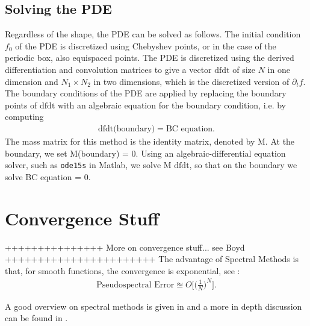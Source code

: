 \subsection{Solving the PDE}
Regardless of the shape, the PDE can be solved as follows.
The initial condition $f_0$ of the PDE is discretized using Chebyshev points, or in the case of the periodic box, also equispaced points. The PDE is discretized using the derived differentiation and convolution matrices to give a vector $\text{dfdt}$ of size $N$ in one dimension and $N_1\times N_2$ in two dimensions, which is the discretized version of $\partial_t f$. The boundary conditions of the PDE are applied by replacing the boundary points of $\text{dfdt}$ with an algebraic equation for the boundary condition, i.e. by computing 
\begin{align*}
	\text{dfdt} \text{(boundary)} = \text{BC equation}.
\end{align*}
The mass matrix for this method is the identity matrix, denoted by M. At the boundary, we set M(boundary) = 0. 
Using an algebraic-differential equation solver, such as \texttt{ode15s} in Matlab, we solve M $\text{dfdt}$, so that on the boundary we solve BC equation = 0.
\section{Convergence Stuff}
+++++++++++++++ More on convergence stuff... see Boyd +++++++++++++++++++++++
The advantage of Spectral Methods is that, for smooth functions, the convergence is exponential, see \cite{Boyd1}:
\begin{align*}
	\text{Pseudospectral Error} \approxeq O \bigg[ \bigg( \frac{1}{N} \bigg)^N \bigg].
\end{align*}


A good overview on spectral methods is given in \cite{bibTrefethen} and a more in depth discussion can be found in \cite{Boyd1}.


